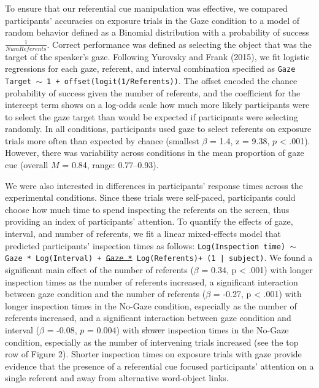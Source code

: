 \documentclass[authoryear, review]{elsarticle}
\providecommand{\DIFaddtex}[1]{{\protect\color{blue}\uwave{#1}}} %
\providecommand{\DIFdeltex}[1]{{\protect\color{red}\sout{#1}}}                      %
\providecommand{\DIFaddbegin}{} %
\providecommand{\DIFaddend}{} %
\providecommand{\DIFdelbegin}{} %
\providecommand{\DIFdelend}{} %
\providecommand{\DIFadd}[1]{\texorpdfstring{\DIFaddtex{#1}}{#1}} %
\providecommand{\DIFdel}[1]{\texorpdfstring{\DIFdeltex{#1}}{}} %
\begin{document}
To ensure that our referential cue manipulation was effective, we
compared participants' accuracies on exposure trials in the Gaze
condition to a model of random behavior defined as a Binomial
distribution with a probability of success \(\frac{1}{Num Referents}\).
Correct performance was defined as selecting the object that was the
target of the speaker's gaze. Following Yurovsky and Frank (2015), we
fit logistic regressions for each gaze, referent, and interval
combination specified as
\texttt{Gaze Target $\sim$ 1 + offset(logit(1/Referents))}. The offset
encoded the chance probability of success given the number of referents,
and the coefficient for the intercept term shows on a log-odds scale how
much more likely participants were to select the gaze target than would
be expected if participants were selecting randomly. In all conditions,
participants used gaze to select referents on exposure trials more often
than expected by chance (smallest \(\beta\) = 1.4, z = 9.38, \(p\)
\textless{} .001). However, there was variability across conditions in
the mean proportion of gaze cue (overall \(M\) = 0.84, range:
0.77--0.93).

We were also interested in differences in participants' response times
across the experimental conditions. Since these trials were self-paced,
participants could choose how much time to spend inspecting the
referents on the screen, thus providing an index of participants'
attention. To quantify the effects of gaze, interval, and number of
referents, we fit a linear mixed-effects model that predicted
participants' inspection times as follows:
\texttt{Log(Inspection time) $\sim$ \DIFaddbegin \DIFadd{(}\DIFaddend Gaze * Log(Interval) + \DIFdelbegin \DIFdel{Gaze * }\DIFdelend Log(Referents)\DIFaddbegin \DIFadd{)$^2$ }\DIFaddend + (1 | subject)}.
We found a significant main effect of the number of referents (\(\beta\)
= 0.34, p \textless{} .001) with longer inspection times as the number
of referents increased, a significant interaction between gaze condition
and the number of referents (\(\beta\) = -0.27, p \textless{} .001) with
longer inspection times in the No-Gaze condition, especially as the
number of referents increased, and a significant interaction between
gaze condition and interval (\(\beta\) = -0.08, \(p\) = 0.004) with
\DIFdelbegin \DIFdel{slower }\DIFdelend \DIFaddbegin \DIFadd{longer }\DIFaddend inspection times in the No-Gaze condition, especially as the
number of intervening trials increased (see the top row of Figure 2).
Shorter inspection times on exposure trials with gaze provide evidence
that the presence of a referential cue focused participants' attention
on a single referent and away from alternative word-object links.
\end{document}
